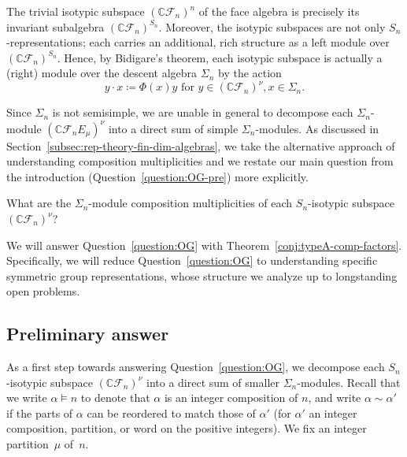 \documentclass[ALCO, Unicode]{cedram}
\def\C{{\mathbb{C}}}
\begin{document}
The trivial isotypic subspace $\left(\C \mathcal{F}_n\right)^{n}$ of the face algebra is precisely its invariant subalgebra $\left(\C \mathcal{F}_n\right)^{S_n}$. Moreover, the isotypic subspaces are not only $S_n$-representations; each carries an additional, rich structure as a left module over $\left(\C \mathcal{F}_n\right)^{S_n}.$ Hence, by Bidigare's theorem, each isotypic subspace is actually a (right) module over the descent algebra $\Sigma_n$ by the action \[y \cdot x  \coloneqq  \Phi(x) y \text{ for } y \in \left(\C \mathcal{F}_n\right)^\nu, x \in \Sigma_n.\] 

Since $\Sigma_n$ is not semisimple, we are unable in general to decompose each $\Sigma_n$-module $\left(\C \mathcal{F}_n E_\mu \right)^\nu$ into a direct sum of simple $\Sigma_n$-modules. As discussed in Section~\ref{subsec:rep-theory-fin-dim-algebras}, we take the alternative approach of understanding composition multiplicities and we restate our main question from the introduction (Question~\ref{question:OG-pre}) more explicitly.

\begin{question}\label{question:OG}
What are the $\Sigma_n$-module composition multiplicities
of each $S_n$-isotypic subspace $\left(\mathbb{C} \mathcal{F}_n \right)^{\nu}$?
\end{question}




We will answer Question~\ref{question:OG} with Theorem~\ref{conj:typeA-comp-factors}. Specifically, we will reduce Question~\ref{question:OG} to understanding specific symmetric group representations, whose structure we analyze up to longstanding open problems. 

\subsection{Preliminary answer}
 As a first step towards answering Question~\ref{question:OG}, we decompose each $S_n$-isotypic subspace $\left(\C \mathcal{F}_n\right)^\nu$ into a direct sum of smaller $\Sigma_n$-modules. Recall that we write $\alpha \vDash n$ to denote that $\alpha$ is an integer composition of $n$, and write $\alpha \sim \alpha'$ if the parts of $\alpha$ can be reordered to match those of $\alpha'$ (for $\alpha'$ an integer composition, partition, or word on the positive integers). We fix an integer partition~$\mu$ of~$n$. 
 
\end{document}
